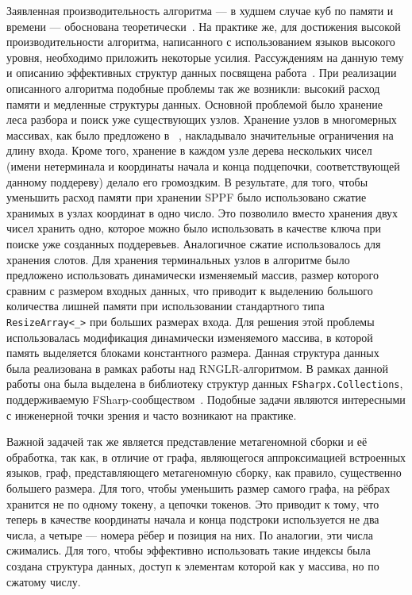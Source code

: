 \documentclass[14pt]{matmex-diploma}
\begin{document}
Заявленная производительность алгоритма --- в худшем случае куб по памяти и времени --- обоснована теоретически~\cite{Johnstone201564}. На практике же, для достижения высокой производительности алгоритма, написанного с использованием языков высокого уровня, необходимо приложить некоторые усилия. Рассуждениям на данную тему и описанию эффективных структур данных посвящена работа~\cite{Johnstone2011}. При реализации описанного алгоритма подобные проблемы так же возникли: высокий расход памяти и медленные структуры данных. Основной проблемой было хранение леса разбора и поиск уже существующих узлов. Хранение узлов в многомерных массивах, как было предложено в ~\cite{Johnstone2011}, накладывало значительные ограничения на длину входа. Кроме того, хранение в каждом узле дерева нескольких чисел (имени нетерминала и координаты начала и конца подцепочки, соответствующей данному поддереву) делало его громоздким. В результате, для того, чтобы уменьшить расход памяти при хранении SPPF было использовано сжатие хранимых в узлах координат в одно число. Это позволило вместо хранения двух чисел хранить одно, которое можно было использовать в качестве ключа при поиске уже созданных поддеревьев. Аналогичное сжатие использовалось для хранения слотов. Для хранения терминальных узлов в алгоритме было предложено использовать динамически изменяемый массив,  размер которого сравним с размером входных данных, что приводит к выделению большого количества лишней памяти при использовании стандартного типа \verb|ResizeArray<_>| при больших размерах входа. Для решения этой проблемы использовалась модификация динамически изменяемого массива, в которой память выделяется блоками константного размера. Данная структура данных была реализована в рамках работы над RNGLR-алгоритмом. В рамках данной работы она была выделена в библиотеку структур данных \texttt{FSharpx.Collections}, поддерживаемую FSharp-сообществом~\cite{FsharpX}. Подобные задачи являются интересными с инженерной точки зрения и часто возникают на практике.

Важной задачей так же является представление метагеномной сборки и её обработка, так как, в отличие от графа, являющегося аппроксимацией встроенных языков, граф, представляющего метагеномную сборку, как правило, существенно большего размера. Для того, чтобы уменьшить размер самого графа, на рёбрах хранится не по одному токену, а цепочки токенов. Это приводит к тому, что теперь в качестве координаты начала и конца подстроки используется не два числа, а четыре --- номера рёбер и позиция на них. По аналогии, эти числа сжимались. Для того, чтобы эффективно использовать такие индексы была создана структура данных, доступ к элементам которой как у массива, но по сжатому числу. 
\end{document}
